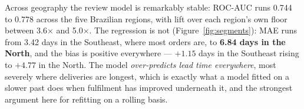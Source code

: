 \label{sec:results-segments}
Across geography the review model is remarkably stable: ROC-AUC runs 0.744 to
0.778 across the five Brazilian regions, with lift over each region's own floor
between 3.6$\times$ and 5.0$\times$. The regression is not
(Figure~\ref{fig:segments}): MAE runs from 3.42 days in the Southeast, where most
orders are, to \textbf{6.84 days in the North}, and the bias is positive
everywhere --- $+1.15$ days in the Southeast rising to $+4.77$ in the North. The
model \emph{over-predicts lead time everywhere}, most severely where deliveries
are longest, which is exactly what a model fitted on a slower past does when
fulfilment has improved underneath it, and the strongest argument here for
refitting on a rolling basis.
